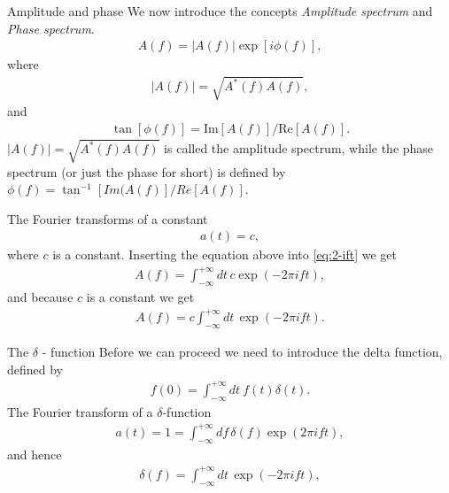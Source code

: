 \documentclass[xcolor=dvipsnames,notes]{beamer}
\begin{document}
\begin{frame}{Amplitude and phase}
We now introduce the concepts  {\em Amplitude spectrum} and
{\em Phase spectrum}. 
%
\begin{eqnarray}
  A(f) = |A(f)|\exp[i\phi(f)],
  \label{eq:2-70}
\end{eqnarray}
%
where
%
\begin{eqnarray}
  |A(f)| = \sqrt{A^*(f) A(f)},
  \label{eq:2-71}
\end{eqnarray}
%
and
%
\begin{eqnarray}
  \tan[\phi(f)] = \mbox{Im}[A(f)]/\mbox{Re}[A(f)].
  \label{eq:2-72}
\end{eqnarray}
%
$|A(f)|=\sqrt{A^*(f)A(f)}$ is called the amplitude spectrum,
while the phase spectrum (or just the phase for short) is defined by
$\phi(f) = \tan^{-1}[Im(A(f)]/Re[A(f)]$.
\end{frame}
\begin{frame}{The Fourier transforms of a constant}
%
\begin{eqnarray}
 a(t)=c,
\end{eqnarray}
where $c$ is a constant.
Inserting the equation above into \eqref{eq:2-ift} we get
%
\begin{eqnarray}
A(f) = \int^{+\infty}_{-\infty} dt\, c \exp(-2\pi i f t), 
\end{eqnarray}
%
and because $c$ is a constant we get
%
\begin{eqnarray}
A(f) = c\int^{+\infty}_{-\infty} dt\, \exp(-2\pi i f t). 
  \label{eq:2-720}
\end{eqnarray}
%
\end{frame}
\begin{frame}{The $\delta$ - function}
Before we can proceed we need to introduce the delta function, defined by
\begin{eqnarray}
f(0)=\int^{+\infty}_{-\infty}dt\ f(t)\delta(t).
\end{eqnarray}
The Fourier transform of a $\delta$-function
%
\begin{eqnarray}
a(t)=1 = \int^{+\infty}_{-\infty} df\, \delta(f)\exp(2\pi i ft),
  \label{eq:2-idelta}
\end{eqnarray}
and hence
%
\begin{eqnarray}
\delta(f)= \int^{+\infty}_{-\infty} dt\, \exp(-2\pi i ft),
  \label{eq:2-idelta}
\end{eqnarray}

%
\end{frame}
\end{document}
